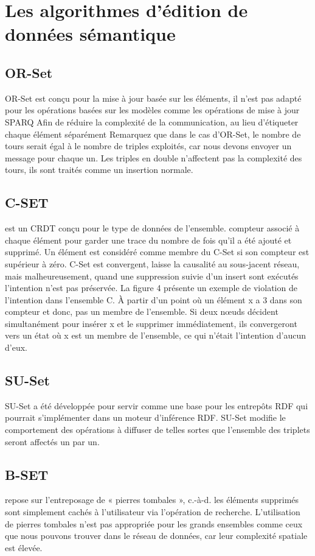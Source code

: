\documentclass[12pt]{report}
\begin{document}
\section{Les algorithmes d'édition de données sémantique}
\subsection{OR-Set}
OR-Set est conçu pour la mise à jour basée sur les éléments, il n’est pas adapté pour les opérations basées sur les modèles comme les opérations de mise à jour SPARQ  Afin de réduire la complexité de la communication, au lieu d’étiqueter chaque élément séparément Remarquez que dans le cas d’OR-Set, le nombre de tours serait égal à le nombre de triples exploités, car nous devons envoyer un message pour chaque un. Les triples en double n’affectent pas la complexité des tours, ils sont traités comme un insertion normale.
\subsection{C-SET \cite{C-SET}}
est un CRDT conçu pour le type de données de l’ensemble.
compteur associé à chaque élément pour garder une trace du nombre de fois qu’il a été ajouté et supprimé. Un élément est considéré comme membre du C-Set si son compteur
est supérieur à zéro. C-Set est convergent, laisse la causalité au sous-jacent réseau, mais malheureusement, quand une suppression suivie d’un insert sont exécutés
l’intention n’est pas préservée. La figure 4 présente un exemple de violation de l’intention dans l’ensemble C. À partir d’un point où un élément x a 3 dans son compteur et donc, pas un membre de l’ensemble. Si deux nœuds décident simultanément pour insérer x et le supprimer immédiatement, ils convergeront vers un état où x est un membre de l’ensemble, ce qui n’était l’intention d’aucun d’eux.
\subsection{SU-Set}
SU-Set a été développée pour servir comme une base pour les entrepôts RDF qui 
pourrait s’implémenter dans un moteur d’inférence RDF. SU-Set modifie le comportement des 
opérations à diffuser de telles sortes que l’ensemble des triplets seront affectés un par un.
\subsection{B-SET \cite{B-SET}} repose sur l’entreposage de « pierres tombales », c.-à-d. les éléments supprimés sont simplement cachés à l’utilisateur via l’opération de recherche. L’utilisation de pierres tombales n’est pas appropriée pour les grands ensembles comme ceux que nous pouvons trouver dans le réseau de données, car leur complexité spatiale est élevée.
\end{document}
